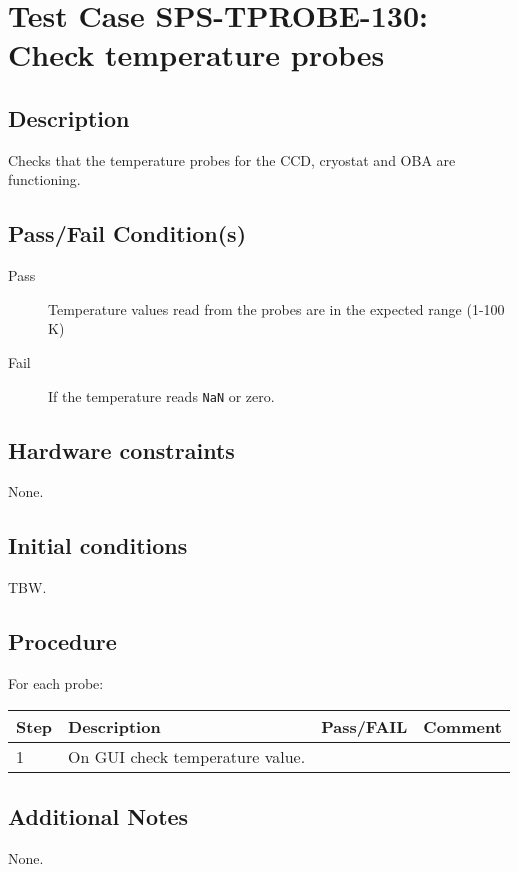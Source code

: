 \section{Test Case SPS-TPROBE-130: Check temperature probes}

\subsection{Description}

Checks that the temperature probes for the CCD, cryostat and OBA are functioning.

\subsection{Pass/Fail Condition(s)}

\begin{description}
\item [Pass] Temperature values read from the probes are in the expected range (1-100 K)
\item [Fail] If the temperature reads \texttt{NaN} or zero.
\end{description}

\subsection{Hardware constraints}

None.

\subsection{Initial conditions}

TBW.

\subsection{Procedure}

For each probe:

\begin{table}[H]
    \begin{tabular}{|l| p{5cm} |l| p{5cm} |}
    \hline
    {\bf Step} & {\bf Description} & {\bf Pass/FAIL} & {\bf Comment}  \\ \hline
    1 & On GUI check temperature value. &  &  \\ \hline
    \end{tabular}
\end{table}

\subsection{Additional Notes}

None.